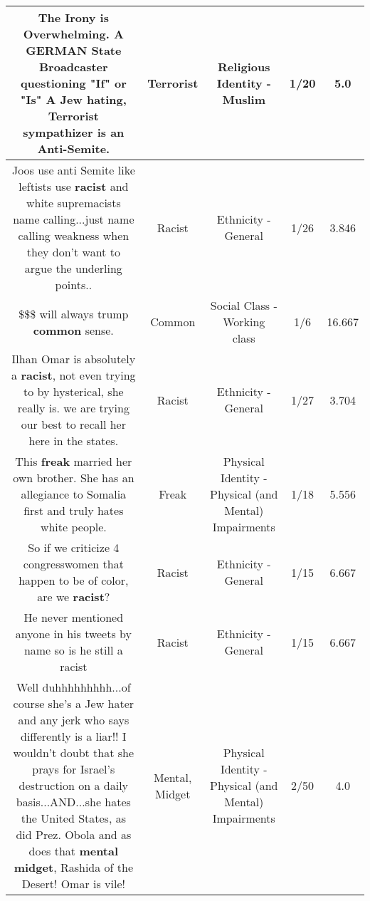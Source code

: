 \documentclass[11pt]{article}
\newlength\mylength
\begin{document}
\begin{center}
\begin{longtable}{|C{.65\mylength}|C{.30\mylength}|C{.12\mylength}|C{.12\mylength}|C{.12\mylength}|}
  \small The Irony is Overwhelming. A GERMAN State Broadcaster questioning "If" or "Is" A Jew hating, \textbf{Terrorist} sympathizer is an Anti-Semite.\normalsize   & Terrorist & Religious Identity - Muslim & 1/20 & 5.0 \\  \hline
  \small Joos use anti Semite like leftists use \textbf{racist} and white supremacists name calling...just name calling weakness when they don't want to argue the  underling points..\normalsize   & Racist & Ethnicity - General & 1/26 & 3.846 \\  \hline
  \small \$\$\$ will always trump \textbf{common} sense.\normalsize   & Common & Social Class - Working class & 1/6 & 16.667 \\  \hline
  \small Ilhan Omar is absolutely a \textbf{racist}, not even trying to by hysterical, she really is. we are trying our best to recall her here in the states.\normalsize   & Racist & Ethnicity - General & 1/27 & 3.704 \\  \hline
  \small This \textbf{freak} married her own brother. She has an allegiance to Somalia first and truly hates white people.\normalsize   & Freak & Physical Identity - Physical (and Mental) Impairments & 1/18 & 5.556 \\  \hline
  \small So if we criticize 4 congresswomen that happen to be of color, are we \textbf{racist}?\normalsize   & Racist & Ethnicity - General & 1/15 & 6.667 \\  \hline
  \small He never mentioned anyone in his tweets by name so is he still a racist\normalsize   & Racist & Ethnicity - General & 1/15 & 6.667 \\  \hline
  \small Well duhhhhhhhhh...of course she's a Jew hater and any jerk who says differently is a liar!! I wouldn't doubt that she prays for Israel's destruction on a daily basis...AND...she hates the United States, as did Prez. Obola and as does that \textbf{mental} \textbf{midget}, Rashida of the Desert! Omar is vile!\normalsize   & Mental, Midget & Physical Identity - Physical (and Mental) Impairments & 2/50 & 4.0 \\  \hline

\end{longtable}
\end{center}
\end{document}
